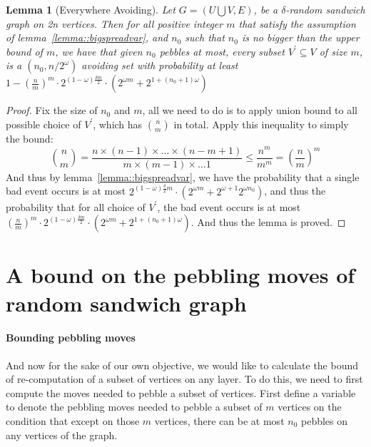 \documentclass[a4paper, oneside]{article}
\newtheorem{lemma}{Lemma}
\begin{document}
\begin{lemma}[Everywhere Avoiding]\label{lemma::everyavoid}
  Let $G = (U \bigcup V, E)$, be a $\delta$-random sandwich graph on 2n vertices. Then for all positive integer $m$ that satisfy the assumption
  of lemma~\ref{lemma::bigspreadvar}, and $n_0$ such that $n_0$ is no bigger than the upper bound of $m$, we have that given $n_0$ pebbles at most,
  every subset $V^\prime \subseteq V$ of size $m$, is a $(n_0, n/2^\omega)$ avoiding set with probability at least
  $1 - (\frac{n}{m})^m \cdot 2^{(1-\omega)\frac{\delta m}{2}} \cdot (2^{\omega m} + 2^{1 + (n_0 + 1) \omega})$
\end{lemma}

\begin{proof}
  Fix the size of $n_0$ and $m$, all we need to do is to apply union bound to all possible choice of $V^\prime$, which has $\binom{n}{m}$ in total.
  Apply this inequality to simply the bound:
  \begin{equation}
    \binom{n}{m} = \frac{n \times (n-1) \times \dots \times (n-m+1)}{m \times (m-1) \times \dots 1} \leq
    \frac{n^m}{m^m} = (\frac{n}{m})^m
  \end{equation}
  And thus by lemma~\ref{lemma::bigspreadvar}, we have the probability that a single bad event occurs is at most
  $2^{(1-\omega)\frac{\delta}{2}m} \cdot (2^{\omega m}+2^{\omega+1}2^{\omega n_0})$, and thus the probability that
  for all choice of $V^\prime$, the bad event occurs is at most
  $(\frac{n}{m})^m \cdot 2^{(1-\omega)\frac{\delta m}{2}} \cdot (2^{\omega m} + 2^{1 + (n_0 + 1) \omega})$.
  And thus the lemma is proved.
\end{proof}

\section{A bound on the pebbling moves of random sandwich graph}
\paragraph{Bounding pebbling moves}
And now for the sake of our own objective, we would like to calculate the bound of re-computation of a subset of vertices on any layer. To do this, we
need to first compute the moves needed to pebble a subset of vertices. First define a variable to denote the pebbling moves needed to pebble a subset of
$m$ vertices on the condition that except on those $m$ vertices, there can be at most $n_0$ pebbles on any vertices of the graph.
\end{document}
